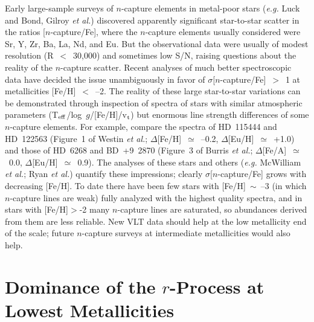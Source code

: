                                                                                                                                                                                                                                                                                                                                                                                                                                                                                                                                                                                                                                                                                                                                                                                                                                                                                                                                                                                                                                                                                                                                                                                                                                                                                                                                                                                                                                                                                                                                                                                                                                                                                                                                                                                                                                                                                                                                                                                                                                                                                                                                                                                                                                                                                                                                                                                                                                                                                                                                                                                                                                                                                                                                                                                                                                                                                                                                                                                                                                                                                                                                                                                                                                                                                                                                                                                                                                                                                                                                                                                                                                                                                                                                                                                                                                                                                                                                                                                                                                                                                                                                                                                                                                                                                                                                                                                                                                                                                                                                                                                                                                                                                                                                                                                                                                                                                                                                                                                                                                                                                                                                                                                                                                                                                                                                                                                                                                                                                                                                                                                                                                                                                                                                                                                                                                                                                                                                                                                                                                                                                                                                                                                                                                                                                                                                                                                                                                                                                                                                                                                                                                                                                                                                                                                                                                                                                                                                                                                                                                                                                                                                                                                                                                                                                                                                                                                                                                                                                                                                                                                                                                                                                                                                                                                                                                                                                                                                                                                                                                                                                                                                                                                                                                                                                                                                                                                                                                                                                                                                                                                                                                                                                                                                                                                                                                                                                                                                                                                                                                                                                                                                                                                                                                                                                                                                                                                                                                                                                                                                                                                                                                                                                                                                                                                                                                                                                                                                                                                                                                                                                                                                                                                                                                                                                                                                                                                                                                                                                                                                                                                                                                                                                                                                                                                                                                                                                                                                                                                                                                                                                                                                                                                                                                                                                                                                                                                                                                                                                                                                                                                                                                                                                                                                                                                                                                                                                                                                                                                                                                                                                                                                                                                                                                                                                                                                                                                                                                                                                                                                                                                                                                                                                                                                                                                                                                                                                                                                                                                                                                                                                                                                                                                                                                                                                                                                                                                                                                                                                                                                                                                                                                                                                                                                                                                                                                                                                                                                                                                                                                                                                                                                                                                                                                                                                                                                                                                                                                                                                                                                                                                                                                                                                                                                                                                                                                                                                                                                                                                                                                                                                                                                                                                                                                                                                                                                                                                                                                                                                                                                                                                                                                                                                                                                                                                            \documentclass{ws-p8-50x6-00}
\begin{document}
Early large-sample surveys of $n$-capture elements in metal-poor stars 
({\it e.g.} Luck and Bond\cite{LB85}, Gilroy {\it et al.}\cite{Gi88}) 
discovered apparently significant star-to-star scatter in the ratios 
[$n$-capture/Fe], where the $n$-capture elements usually considered were 
Sr, Y, Zr, Ba, La, Nd, and Eu.  
But the observational data were usually of modest resolution (R~$<$~30,000) 
and sometimes low S/N, raising questions about the reality of the 
$n$-capture scatter.  
Recent analyses of much better spectroscopic data have decided the issue 
unambiguously in favor of $\sigma$[$n$-capture/Fe]~$>$~1 at metallicities 
[Fe/H]~$<$~--2.
The reality of these large star-to-star variations can be demonstrated
through inspection of spectra of stars with similar atmospheric parameters 
(T$_{\rm eff}$/log~$g$/[Fe/H]/v$_{\rm t}$) but enormous line 
strength differences of some $n$-capture elements.  
For example, compare the spectra of HD~115444 and HD~122563 
(Figure~1 of Westin {\it et al.}\cite{We00}; $\Delta$[Fe/H]~$\simeq$~--0.2, 
$\Delta$[Eu/H]~$\simeq$~+1.0) and those of HD~6268 and BD~+9~2870 
(Figure~3 of Burris {\it et al.}\cite{Bu00}; $\Delta$[Fe/A]~$\simeq$~0.0, 
$\Delta$[Eu/H]~$\simeq$~0.9). 
The analyses of these stars and others ({\it e.g.} McWilliam 
{\it et al.}\cite{Mc95}; Ryan {\it et al.}\cite{Ry96}) quantify these 
impressions; clearly $\sigma$[$n$-capture/Fe] grows with decreasing [Fe/H].  
To date there have been few stars with [Fe/H]~$\sim$~--3 (in which 
$n$-capture lines are weak) fully analyzed with the highest quality spectra,
and in stars with [Fe/H]$>$-2 many $n$-capture lines are saturated,
so abundances derived from them are less reliable.  
New VLT data should help at the low metallicity end of the scale; 
future $n$-capture surveys at intermediate metallicities would also help.






\section{Dominance of the $r$-Process at Lowest Metallicities}
 
\end{document}
